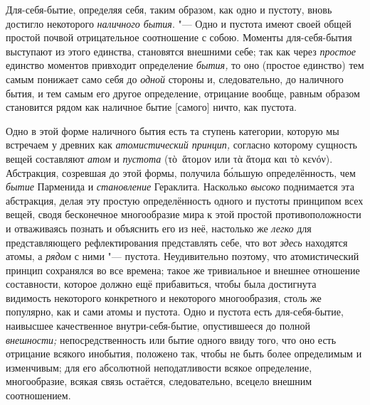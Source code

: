 Для-себя-бытие, определяя себя, таким образом, как одно и пустоту, вновь
достигло некоторого {\em наличного бытия}. "--- Одно и
пустота имеют своей общей простой почвой отрицательное соотношение с собою.
Моменты для-себя-бытия выступают из этого единства, становятся внешними
себе; так как через {\em простое} единство моментов
привходит определение {\em бытия,} то оно (простое
единство) тем самым понижает само себя до {\em одной}
стороны и, следовательно, до наличного бытия, и тем самым его другое
определение, отрицание вообще, равным образом становится рядом как наличное
бытие [самого] ничто, как пустота.


Одно в этой форме наличного бытия есть та ступень категории, которую мы
встречаем у древних как {\em атомистический принцип,}
согласно которому сущность вещей составляют {\em атом} и {\em пустота}
(\textgreek{τὸ~ἅτομον} или \textgreek{τὰ ἅτομα και τὸ κενόν}).
Абстракция, созревшая до этой формы, получила б\'{о}льшую определённость, чем
{\em бытие} Парменида и {\em становление} Гераклита. Насколько
{\em высоко} поднимается эта абстракция, делая эту
простую определённость одного и пустоты принципом всех вещей, сводя
бесконечное многообразие мира к этой простой противоположности и
отваживаясь познать и объяснить его из неё, настолько же
{\em легко} для представляющего рефлектирования
представлять себе, что вот {\em здесь} находятся атомы,
а {\em рядом} с ними "--- пустота. Неудивительно поэтому,
что атомистический принцип сохранялся во все времена; такое же тривиальное
и внешнее отношение составности, которое должно ещё прибавиться, чтобы была
достигнута видимость некоторого конкретного и некоторого многообразия,
столь же популярно, как и сами атомы и пустота. Одно и пустота есть
для-себя-бытие, наивысшее качественное внутри-себя-бытие, опустившееся до
полной {\em внешности;} непосредственность или бытие
одного ввиду того, что оно есть отрицание всякого инобытия, положено так,
чтобы не быть более определимым и изменчивым; для его абсолютной
неподатливости всякое определение, многообразие, всякая связь остаётся,
следовательно, всецело внешним соотношением.


